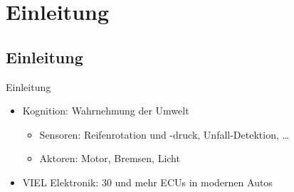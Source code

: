 \section{Einleitung}

\subsection{Einleitung}

\begin{frame}{Einleitung}
    \begin{itemize}[<+->]
        \item Kognition: Wahrnehmung der Umwelt
        \begin{itemize}
            \item Sensoren: Reifenrotation und -druck, Unfall-Detektion, \dots
            \item Aktoren: Motor, Bremsen, Licht
        \end{itemize}
        \item VIEL Elektronik: 30 und mehr ECUs in modernen Autos
    \end{itemize}
\end{frame}